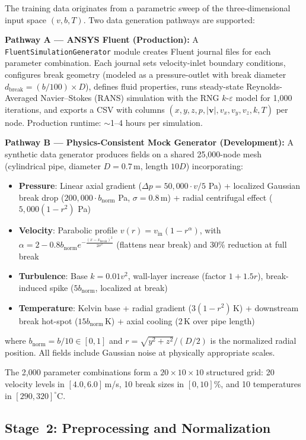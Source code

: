 \documentclass[journal]{IEEEtran}
\begin{document}
The training data originates from a parametric sweep of the three-dimensional input space $(v, b, T)$. Two data generation pathways are supported:

\textbf{Pathway A --- ANSYS Fluent (Production):}
A \texttt{FluentSimulationGenerator} module creates Fluent journal files for each parameter combination. Each journal sets velocity-inlet boundary conditions, configures break geometry (modeled as a pressure-outlet with break diameter $d_\text{break} = (b/100) \times D$), defines fluid properties, runs steady-state Reynolds-Averaged Navier--Stokes (RANS) simulation with the RNG $k$-$\varepsilon$ model for 1,000 iterations, and exports a CSV with columns $(x, y, z, p, |\bm{v}|, v_x, v_y, v_z, k, T)$ per node. Production runtime: $\sim$1--4 hours per simulation.

\textbf{Pathway B --- Physics-Consistent Mock Generator (Development):}
A synthetic data generator produces fields on a shared 25,000-node mesh (cylindrical pipe, diameter $D = 0.7$\,m, length $10D$) incorporating:
\begin{itemize}
    \item \textbf{Pressure}: Linear axial gradient ($\Delta p = 50{,}000 \cdot v/5$ Pa) + localized Gaussian break drop ($200{,}000 \cdot b_\text{norm}$ Pa, $\sigma = 0.8$\,m) + radial centrifugal effect ($5{,}000(1 - r^2)$ Pa)
    \item \textbf{Velocity}: Parabolic profile $v(r) = v_\text{in}(1 - r^{\alpha})$, with $\alpha = 2 - 0.8 b_\text{norm} e^{-\frac{(x - x_\text{break})^2}{2\sigma^2}}$ (flattens near break) and 30\% reduction at full break
    \item \textbf{Turbulence}: Base $k = 0.01 v^2$, wall-layer increase (factor $1 + 1.5r$), break-induced spike ($5 b_\text{norm}$, localized at break)
    \item \textbf{Temperature}: Kelvin base + radial gradient ($3(1-r^2)$\,K) + downstream break hot-spot ($15 b_\text{norm}$\,K) + axial cooling (2\,K over pipe length)
\end{itemize}
where $b_\text{norm} = b/10 \in [0,1]$ and $r = \sqrt{y^2 + z^2}/(D/2)$ is the normalized radial position. All fields include Gaussian noise at physically appropriate scales.

The 2,000 parameter combinations form a $20 \times 10 \times 10$ structured grid: 20 velocity levels in $[4.0, 6.0]$\,m/s, 10 break sizes in $[0, 10]$\%, and 10 temperatures in $[290, 320]^\circ$C.

\subsection{Stage~2: Preprocessing and Normalization}
\end{document}
